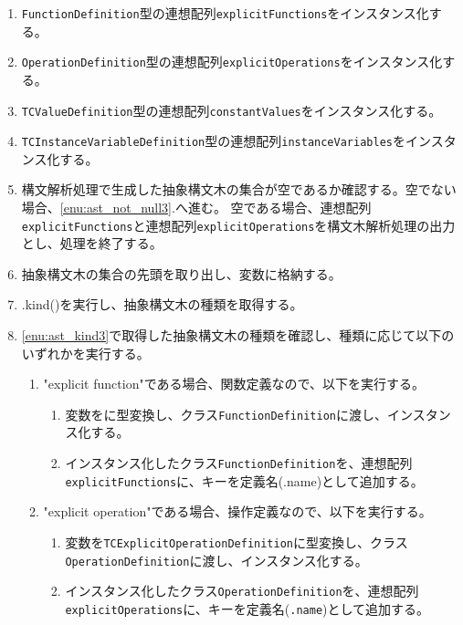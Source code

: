 \documentclass[uplatex, report, a4j, 10pt]{jsbook}
\newcommand\ttt[1]{\texttt{#1}}
\begin{document}
\begin{enumerate}
  \item \ttt{FunctionDefinition}型の連想配列\ttt{explicitFunctions}をインスタンス化する。
  \item \ttt{OperationDefinition}型の連想配列\ttt{explicitOperations}をインスタンス化する。
  \item \ttt{TCValueDefinition}型の連想配列\ttt{constantValues}をインスタンス化する。
  \item \ttt{TCInstanceVariableDefinition}型の連想配列\ttt{instanceVariables}をインスタンス化する。
  \item\label{enu:checkAstIsNull3} 構文解析処理で生成した抽象構文木の集合が空であるか確認する。空でない場合、\ref{enu:ast_not_null3}.へ進む。
        空である場合、連想配列\ttt{explicitFunctions}と連想配列\ttt{explicitOperations}を構文木解析処理の出力とし、処理を終了する。
  \item\label{enu:ast_not_null3} 抽象構文木の集合の先頭を取り出し、変数\astDefinition{}に格納する。
  \item\label{enu:ast_kind3} \astDefinition{}.kind()を実行し、抽象構文木の種類を取得する。
  \item \ref{enu:ast_kind3}で取得した抽象構文木の種類を確認し、種類に応じて以下のいずれかを実行する。
        \begin{enumerate}
          \item "explicit function"である場合、関数定義なので、以下を実行する。
                \begin{enumerate}
                  \item 変数\astDefinition{}を\TCExplicitFunctionDefinition{}に型変換し、クラス\ttt{FunctionDefinition}に渡し、インスタンス化する。
                  \item インスタンス化したクラス\ttt{FunctionDefinition}を、連想配列\ttt{explicitFunctions}に、キーを定義名(\astDefinition{}.name)として追加する。
                \end{enumerate}
          \item "explicit operation"である場合、操作定義なので、以下を実行する。
                \begin{enumerate}
                  \item 変数\astDefinition{}を\ttt{TCExplicitOperationDefinition}に型変換し、クラス\ttt{OperationDefinition}に渡し、インスタンス化する。
                  \item インスタンス化したクラス\ttt{OperationDefinition}を、連想配列\ttt{explicitOperations}に、キーを定義名(\astDefinition{}\ttt{.name})として追加する。

\end{enumerate}
\end{enumerate}
\end{enumerate}
\end{document}
